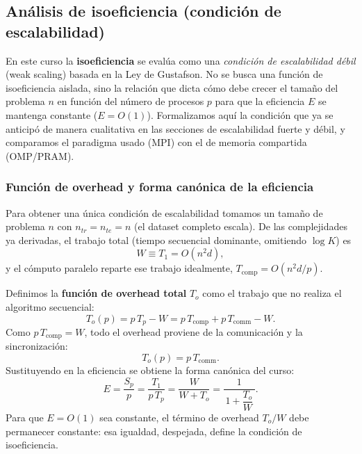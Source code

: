 
\subsection{Análisis de isoeficiencia (condición de escalabilidad)}

En este curso la \textbf{isoeficiencia} se evalúa como una \emph{condición de escalabilidad
débil} (weak scaling) basada en la Ley de Gustafson. No se busca una función de isoeficiencia
aislada, sino la relación que dicta cómo debe crecer el tamaño del problema $n$ en función del
número de procesos $p$ para que la eficiencia $E$ se mantenga constante ($E=O(1)$). Formalizamos
aquí la condición que ya se anticipó de manera cualitativa en las secciones de escalabilidad
fuerte y débil, y comparamos el paradigma usado (MPI) con el de memoria compartida (OMP/PRAM).

\subsubsection{Función de overhead y forma canónica de la eficiencia}

Para obtener una única condición de escalabilidad tomamos un tamaño de problema $n$ con
$n_{tr}=n_{te}=n$ (el dataset completo escala). De las complejidades ya derivadas, el trabajo
total (tiempo secuencial dominante, omitiendo $\log K$) es
\[
W \equiv T_1 = O(n^2 d),
\]
y el cómputo paralelo reparte ese trabajo idealmente, $T_{\text{comp}} = O(n^2 d / p)$.

Definimos la \textbf{función de overhead total} $T_o$ como el trabajo que no realiza el algoritmo
secuencial:
\[
T_o(p) = p\,T_p - W = p\,T_{\text{comp}} + p\,T_{\text{comm}} - W.
\]
Como $p\,T_{\text{comp}} = W$, todo el overhead proviene de la comunicación y la sincronización:
\[
\boxed{\; T_o(p) = p\, T_{\text{comm}}. \;}
\]
Sustituyendo en la eficiencia se obtiene la forma canónica del curso:
\[
E = \frac{S_p}{p} = \frac{T_1}{p\,T_p} = \frac{W}{W + T_o}
  = \frac{1}{\,1 + \dfrac{T_o}{W}\,}.
\]
Para que $E=O(1)$ sea constante, el término de overhead $T_o/W$ debe permanecer constante: esa
igualdad, despejada, define la condición de isoeficiencia.


